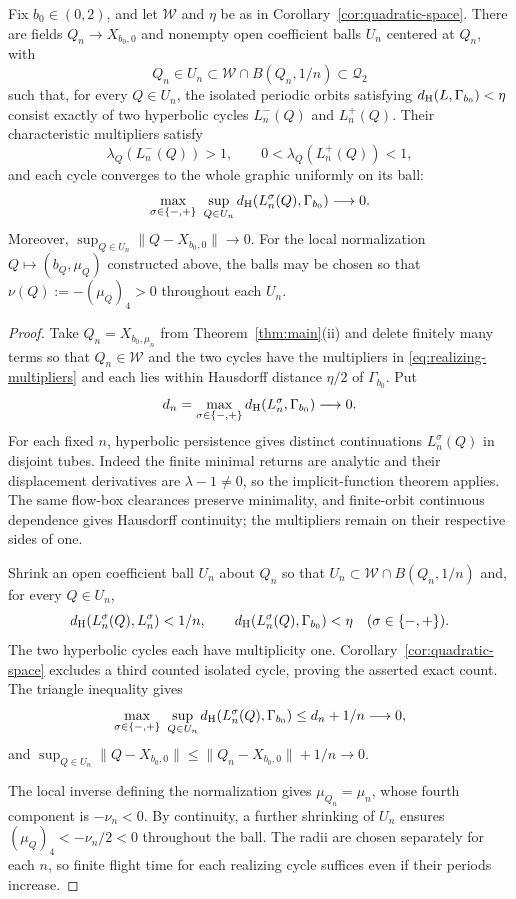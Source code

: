 \begin{corollary}\label{cor:open-quadratic-realization}
Fix $b_0\in(0,2)$, and let $\mathcal W$ and $\eta$ be as in
Corollary~\ref{cor:quadratic-space}. There are fields
$Q_n\to X_{b_0,0}$ and nonempty open coefficient balls $U_n$
centered at $Q_n$, with
\[
 Q_n\in U_n\subset\mathcal W\cap B(Q_n,1/n)\subset\mathcal Q_2
\]
such that, for every $Q\in U_n$, the isolated periodic orbits satisfying
$d_{\rm H}(L,\Gamma_{b_0})<\eta$ consist exactly of two hyperbolic
cycles $L_n^-(Q)$ and $L_n^+(Q)$. Their characteristic multipliers
satisfy
\[
 \lambda_Q(L_n^-(Q))>1,\qquad
 0<\lambda_Q(L_n^+(Q))<1,
\]
and each cycle converges to the whole graphic uniformly on its ball:
\[
 \max_{\sigma\in\{-,+\}}\ \sup_{Q\in U_n}
 d_{\rm H}(L_n^\sigma(Q),\Gamma_{b_0})\longrightarrow0.
\]
Moreover,
$\sup_{Q\in U_n}\|Q-X_{b_0,0}\|\to0$.
For the local normalization $Q\mapsto(b_Q,\mu_Q)$ constructed above,
the balls may be chosen so that $\nu(Q):=-(\mu_Q)_4>0$ throughout
each $U_n$.
\end{corollary}

\begin{proof}
Take $Q_n=X_{b_0,\mu_n}$ from Theorem~\ref{thm:main}(ii) and delete
finitely many terms so that $Q_n\in\mathcal W$ and the two cycles
have the multipliers in \eqref{eq:realizing-multipliers} and each lies
within Hausdorff distance $\eta/2$ of $\Gamma_{b_0}$. Put
\[
 d_n=\max_{\sigma\in\{-,+\}}
 d_{\rm H}(L_n^\sigma,\Gamma_{b_0})\longrightarrow0.
\]
For each fixed $n$, hyperbolic persistence gives distinct continuations
$L_n^\sigma(Q)$ in disjoint tubes. Indeed the finite minimal returns
are analytic and their displacement derivatives are
$\lambda-1\ne0$, so the implicit-function theorem applies. The same
flow-box clearances preserve minimality, and finite-orbit continuous
dependence gives Hausdorff continuity; the multipliers remain on their
respective sides of one.

Shrink an open coefficient ball $U_n$ about $Q_n$ so that
$U_n\subset\mathcal W\cap B(Q_n,1/n)$ and, for every $Q\in U_n$,
\[
 d_{\rm H}(L_n^\sigma(Q),L_n^\sigma)<1/n,\qquad
 d_{\rm H}(L_n^\sigma(Q),\Gamma_{b_0})<\eta
 \quad(\sigma\in\{-,+\}).
\]
The two hyperbolic cycles each have multiplicity one.
Corollary~\ref{cor:quadratic-space} excludes a third counted isolated
cycle, proving the asserted exact count. The triangle inequality gives
\[
 \max_{\sigma\in\{-,+\}}\ \sup_{Q\in U_n}
 d_{\rm H}(L_n^\sigma(Q),\Gamma_{b_0})\le d_n+1/n\longrightarrow0,
\]
and
$\sup_{Q\in U_n}\|Q-X_{b_0,0}\|
 \le\|Q_n-X_{b_0,0}\|+1/n\to0$.

The local inverse defining the normalization gives
$\mu_{Q_n}=\mu_n$, whose fourth component is $-\nu_n<0$.
By continuity, a further shrinking of $U_n$ ensures
$(\mu_Q)_4<-\nu_n/2<0$ throughout the ball.
The radii are chosen separately for each $n$, so finite flight time
for each realizing cycle suffices even if their periods increase.
\end{proof}
